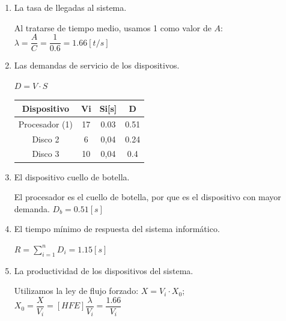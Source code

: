 \begin{enumerate}
    \item La tasa de llegadas al sistema.
    \begin{tcolorbox}[colback=white,colframe=cyan!50!black,fonttitle=\bfseries]
    Al tratarse de tiempo medio, usamos 1 como valor de $A$:\\
    $\lambda = \dfrac{A}{C} = \dfrac{1}{0.6} = 1.66[t/s]$
    \end{tcolorbox}
    \item Las demandas de servicio de los dispositivos.
    \begin{tcolorbox}[colback=white,colframe=cyan!50!black,fonttitle=\bfseries]
    $D=V\cdot S$
    \begin{table}[H]\centering\begin{tabular}{|c|c|c|c|}\hline
    \textbf{Dispositivo}    & \textbf{Vi} & \textbf{Si[s]} & \textbf{D}\\ \hline
    Procesador (1) & 17 & 0.03 & 0.51   \\ \hline
    Disco 2        & 6  & 0,04 & 0.24  \\ \hline
    Disco 3        & 10 & 0,04 & 0.4   \\ \hline
    \end{tabular}\end{table}
    \end{tcolorbox}
    \item El dispositivo cuello de botella.
    \begin{tcolorbox}[colback=white,colframe=cyan!50!black,fonttitle=\bfseries]
    El procesador es el cuello de botella, por que es el dispositivo con mayor demanda.
    $D_b = 0.51[s]$
    \end{tcolorbox}
    \item El tiempo mínimo de respuesta del sistema informático.
    \begin{tcolorbox}[colback=white,colframe=cyan!50!black,fonttitle=\bfseries]
    $R=\sum_{i=1}^{n}D_i=1.15[s]$
    \end{tcolorbox}
    \item La productividad de los dispositivos del sistema.
    \begin{tcolorbox}[colback=white,colframe=cyan!50!black,fonttitle=\bfseries]
    Utilizamos la ley de flujo forzado: $X = V_i \cdot X_0$; \\
    $X_0 = \dfrac{X}{V_i}=[HFE]\dfrac{\lambda}{V_i}=\dfrac{1.66}{V_i}$
    \begin{table}[H]\centering\begin{tabular}{|c|c|c|c|c|}\hline

\end{tabular}
\end{table}
\end{tcolorbox}
\end{enumerate}
